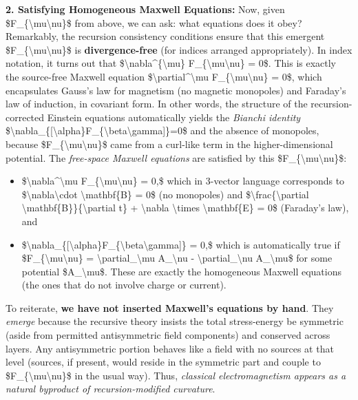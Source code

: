 \documentclass[]{article}
\begin{document}
\textbf{2. Satisfying Homogeneous Maxwell Equations:} Now, given
\$F\_\{\textbackslash{}mu\textbackslash{}nu\}\$ from above, we can ask:
what equations does it obey? Remarkably, the recursion consistency
conditions ensure that this emergent
\$F\_\{\textbackslash{}mu\textbackslash{}nu\}\$ is
\textbf{divergence-free} (for indices arranged appropriately). In index
notation, it turns out that
\$\textbackslash{}nabla\^{}\{\textbackslash{}mu\}
F\_\{\textbackslash{}mu\textbackslash{}nu\} = 0\$​. This is exactly the
source-free Maxwell equation
\$\textbackslash{}partial\^{}\textbackslash{}mu
F\_\{\textbackslash{}mu\textbackslash{}nu\} = 0\$, which encapsulates
Gauss's law for magnetism (no magnetic monopoles) and Faraday's law of
induction, in covariant form. In other words, the structure of the
recursion-corrected Einstein equations automatically yields the
\emph{Bianchi identity}
\$\textbackslash{}nabla\_\{{[}\textbackslash{}alpha\}F\_\{\textbackslash{}beta\textbackslash{}gamma{]}\}=0\$
and the absence of monopoles, because
\$F\_\{\textbackslash{}mu\textbackslash{}nu\}\$ came from a curl-like
term in the higher-dimensional potential​. The \emph{free-space Maxwell
equations} are satisfied by this
\$F\_\{\textbackslash{}mu\textbackslash{}nu\}\$:

\begin{itemize}
\item
  \$\textbackslash{}nabla\^{}\textbackslash{}mu
  F\_\{\textbackslash{}mu\textbackslash{}nu\} = 0,\$ which in 3-vector
  language corresponds to \$\textbackslash{}nabla\textbackslash{}cdot
  \textbackslash{}mathbf\{B\} = 0\$ (no monopoles) and
  \$\textbackslash{}frac\{\textbackslash{}partial
  \textbackslash{}mathbf\{B\}\}\{\textbackslash{}partial t\} +
  \textbackslash{}nabla \textbackslash{}times
  \textbackslash{}mathbf\{E\} = 0\$ (Faraday's law), and
\item
  \$\textbackslash{}nabla\_\{{[}\textbackslash{}alpha\}F\_\{\textbackslash{}beta\textbackslash{}gamma{]}\}
  = 0,\$ which is automatically true if
  \$F\_\{\textbackslash{}mu\textbackslash{}nu\} =
  \textbackslash{}partial\_\textbackslash{}mu A\_\textbackslash{}nu -
  \textbackslash{}partial\_\textbackslash{}nu A\_\textbackslash{}mu\$
  for some potential \$A\_\textbackslash{}mu\$. These are exactly the
  homogeneous Maxwell equations (the ones that do not involve charge or
  current)​.
\end{itemize}

To reiterate, \textbf{we have not inserted Maxwell's equations by hand}.
They \emph{emerge} because the recursive theory insists the total
stress-energy be symmetric (aside from permitted antisymmetric field
components) and conserved across layers. Any antisymmetric portion
behaves like a field with no sources at that level (sources, if present,
would reside in the symmetric part and couple to
\$F\_\{\textbackslash{}mu\textbackslash{}nu\}\$ in the usual way). Thus,
\emph{classical electromagnetism appears as a natural byproduct of
recursion-modified curvature}​.
\end{document}
